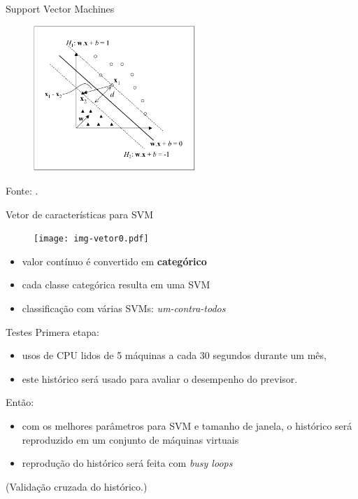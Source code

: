 \documentclass{beamer}
\begin{document}
\begin{frame}{Support Vector Machines}
\begin{figure}
\centering
\includegraphics[height=5.5cm]{img/fig-hiperplanos.png}
\end{figure}
\tiny{Fonte: \cite{lorena2003introducaoas}.}
\end{frame}

\begin{frame}{Vetor de características para SVM}
\begin{figure}
\centering
\texttt{[image: img-vetor0.pdf]}
\end{figure}
\begin{itemize}
\item valor contínuo é convertido em \textbf{categórico}
\item cada classe categórica resulta em uma SVM
\item classificação com várias SVMs: \emph{um-contra-todos}
\end{itemize}
\end{frame}

\begin{frame}{Testes}
Primera etapa:
\begin{itemize}
\item usos de CPU lidos de 5 máquinas a cada 30 segundos durante um mês,
\item este histórico será usado para avaliar o desempenho do previsor.
\end{itemize}
Então:
\begin{itemize}
\item com os melhores parâmetros para SVM e tamanho de janela, o histórico
será reproduzido em um conjunto de máquinas virtuais
\item reprodução do histórico será feita com \emph{busy loops}
\end{itemize}
\tiny{(Validação cruzada do histórico.)}
\end{frame}
\end{document}
